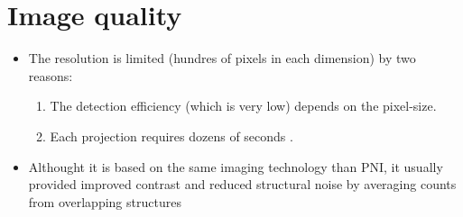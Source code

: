 \section{Image quality}
\begin{itemize}
\item The resolution is limited (hundres of pixels in each dimension)
  by two reasons:
  \begin{enumerate}
  \item The detection efficiency (which is very low) depends on the
    pixel-size.
  \item Each projection requires dozens of seconds
    \cite{abdulla2025SPECT}.
  \end{enumerate}
\item Althought it is based on the same imaging technology than PNI,
  it usually provided improved contrast and reduced structural noise
  by averaging counts from overlapping structures
\end{itemize}